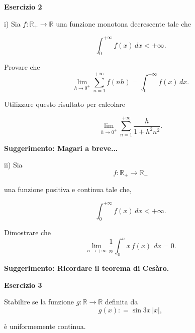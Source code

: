 \documentclass[12pt, oneside]{article}   	%
\begin{document}
     {\bf Esercizio 2}
   \bigskip

   i) Sia $f: \mathbb{R_+}\to \mathbb{R}$ una funzione monotona decrescente tale che

    $$\int_0^{+\infty}  f(x)\,dx<+\infty.$$


    Provare che
    $$\lim_{h\to 0^+} \sum_{n=1}^{+\infty} f(nh) = \int_0^{+\infty}  f(x)\,dx.$$

     Utilizzare questo risultato per calcolare

     $$\lim_{h\to 0^+} \sum_{n=1}^{+\infty} \frac{h}{1+h^2 n^2}.$$

     {\bf Suggerimento: Magari a breve... }

   ii) Sia $$f: \mathbb{R_+} \to  \mathbb{R_+}$$

    una funzione positiva e continua tale che,

    $$\int_0^{+\infty}  f(x)\,dx<+\infty.$$

   Dimostrare che
   $$\lim_{n\to +\infty} \frac{1}{n} \int_0^n x\,f(x) \,\,dx =0.$$

   {\bf Suggerimento: Ricordare il teorema di Ces\`aro. }

      {\bf Esercizio 3}
   \bigskip



   Stabilire se la funzione $g: \mathbb{R} \to  \mathbb{R} $ definita da
   $$g(x) : = \sin 3x \, |x|,$$

   \`e uniformemente continua.
\end{document}
